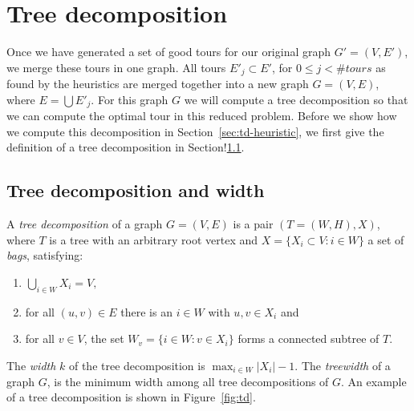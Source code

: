 \documentclass[titlepage, 12pt]{article}
\begin{document}
%
%
\section{Tree decomposition}
\label{sec:td}
Once we have generated a set of good tours for our original graph $G'=(V,E')$, we merge these
tours in one graph. All tours $E'_j \subset E'$, for $0 \leq j < \#tours$ as found by the
heuristics are merged together into a new graph $G = (V, E)$, where $E=\bigcup E'_j$. For this graph
$G$ we will compute a tree decomposition so that we can compute the optimal tour in this reduced
problem.
Before we show how we compute this decomposition in Section~\ref{sec:td-heuristic}, we first give
the definition of a tree decomposition in Section!\ref{sec:td-definition}.

    \subsection{Tree decomposition and width}
    \label{sec:td-definition}
    A \emph{tree decomposition} of a graph $G=(V, E)$ is a pair $(T=(W, H), X)$, where $T$ is a tree
    with an arbitrary root vertex and $X=\{X_i \subset V : i \in W\}$ a set of \emph{bags},
    satisfying:
    \begin{enumerate}
        \item $\bigcup_{i \in W} X_i = V,$
        \item for all $(u, v) \in E$ there is an $i \in W$ with $u, v \in X_i$ and
        \item for all $v \in V$, the set $W_v = \{i \in W: v \in X_i\}$ forms a connected subtree of $T$.
    \end{enumerate}
    The \emph{width} $k$ of the tree decomposition is $\max_{i \in W} |X_i| - 1$. The \emph{treewidth}
    of a graph $G$, is the minimum width among all tree decompositions of $G$.
    An example of a tree decomposition is shown in Figure~\ref{fig:td}.
\end{document}
